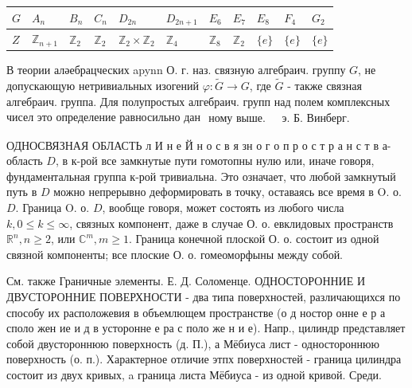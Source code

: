 \documentclass[10pt]{article}
\begin{document}
\begin{center}

\begin{tabular}{l|llllllllll}

$G$ & $A_{n}$ & $B_{n}$ & $C_{n}$ & $D_{2 n}$ & $D_{2 n+1}$ & $E_{6}$ & $E_{7}$ & $E_{8}$ & $F_{4}$ & $G_{2}$ \\

\hline

$Z$ & $\mathbb{Z}_{n+1}$ & $\mathbb{Z}_{2}$ & $\mathbb{Z}_{2}$ & $\mathbb{Z}_{2} \times \mathbb{Z}_{2}$ & $\mathbb{Z}_{4}$ & $\mathbb{Z}_{8}$ & $\mathbb{Z}_{2}$ & $\{e\}$ & $\{e\}$ & $\{e\}$ \\

\hline

\end{tabular}

\end{center}



В теории аләебрацческих apynn О. г. наз. связную алгебраич. группу $G$, не допускающую нетривиальных изогений $\varphi: \widetilde{G} \rightarrow G$, где $\widetilde{G}$ - также связная алгебраич. группа. Для полупростых алгебраич. групп над полем комплексных чисел это определение равносильно дан$\begin{array}{ll}\text { ному выше. } & \text { э. Б. Винберг. }\end{array}$



ОДНОСВЯЗНАЯ ОБЛАСТЬ л И н е Й н о с в я зн о г о п р о с т р а н с т в а-область $D$, в к-рой все замкнутые пути гомотопны нулю или, иначе говоря, фундаментальная группа к-рой тривиальна. Это означает, что любой замкнутый путь в $D$ можно непрерывно деформировать в точку, оставаясь все время в O. о. $D$. Граница O. о. $D$, вообще говоря, может состоять из любого числа $k, 0 \leqslant k \leqslant \infty$, связных компонент, даже в случае О. о. евклидовых пространств $\mathbb{R}^{n}, n \geqslant 2$, или $\mathbb{C}^{m}, m \geqslant 1$. Граница конечной плоской О. о. состоит из одной связной компоненты; все плоские О. о. гомеоморфыны между собой.



См. также Граничные элементы. Е. Д. Соломенце. ОДНОСТОРОННИЕ И ДВУСТОРОННИЕ ПОВЕРХНОСТИ - два типа поверхностей, различающихся по способу их расположевия в объемлющем пространстве (о д ностор онне е р а споло жен ие и д в усторонне е ра с поло же н и е). Напр., цилиндр представляет собой двустороннюю поверхность (д. П.), а Мёбиуса лист - одностороннюю поверхность (о. п.). Характерное отличие этпх поверхностей - граница цилиндра состоит из двух кривых, a граница листа Мёбиуса - из одной кривой. Среди.
\end{document}
